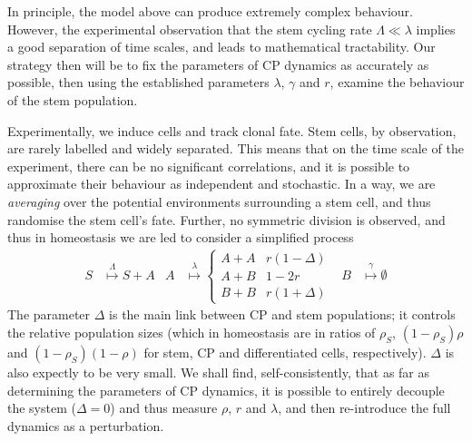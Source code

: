 \documentclass[10pt,UKenglish]{article}
\begin{document}
In principle, the model above can produce extremely complex behaviour. However, the experimental observation that the stem cycling rate $\Lambda \ll \lambda$ implies a good separation of time scales, and leads to mathematical tractability. Our strategy then will be to fix the parameters of CP dynamics as accurately as possible, then using the established parameters $\lambda$, $\gamma$ and $r$, examine the behaviour of the stem population.

Experimentally, we induce cells and track clonal fate. Stem cells, by observation, are rarely labelled and widely separated. This means that on the time scale of the experiment, there can be no significant correlations, and it is possible to approximate their behaviour as independent and stochastic. In a way, we are \emph{averaging} over the potential environments surrounding a stem cell, and thus randomise the stem cell's fate. Further, no symmetric division is observed, and thus in homeostasis we are led to consider a simplified process \begin{align}
S &\overset{\Lambda}{\longmapsto} S+A & A &\overset{\lambda}{\longmapsto} \begin{cases}
A+A & r(1-\Delta) \\
A+B & 1-2r \\
B+B & r(1+\Delta)\end{cases} & B &\overset{\gamma}{\longmapsto} \emptyset
\label{eq:full-model}
\end{align}
The parameter $\Delta$ is the main link between CP and stem populations; it controls the relative population sizes (which in homeostasis are in ratios of $\rho_S$, $(1-\rho_S)\rho$ and $(1-\rho_S)(1-\rho)$ for stem, CP and differentiated cells, respectively). $\Delta$ is also expectly to be very small. We shall find, self-consistently, that as far as determining the parameters of CP dynamics, it is possible to entirely decouple the system ($\Delta = 0$) and thus measure $\rho$, $r$ and $\lambda$, and then re-introduce the full dynamics as a perturbation.
\end{document}

